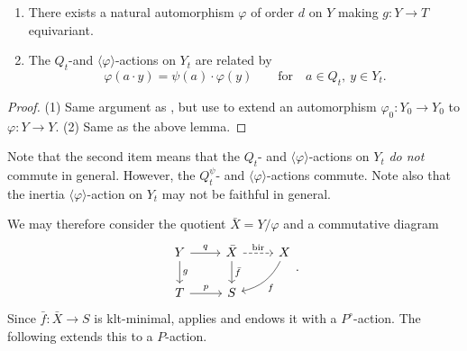 \documentclass[reqno, letterpaper]{amsart}
\numberwithin{equation}{subsection}
\let\to\longrightarrow
\begin{document}
			\begin{proposition} \label{prop:varphi-action}
				\begin{enumerate}
					\item There exists a natural automorphism $\varphi$ of order $d$ on $Y$ making $g : Y \to T$ equivariant.
					\item The $Q_t$-and $\langle \varphi \rangle$-actions on $Y_t$ are related by
					\[ \varphi(a \cdot y) = \psi(a) \cdot \varphi(y) \qquad\mbox{for}\quad a \in Q_t , \ y \in Y_t .\]
				\end{enumerate}
			\end{proposition}
			\begin{proof}
				(1) Same argument as , but use  to extend an automorphism $\varphi_0 : Y_0 \to Y_0$ to $\varphi : Y \to Y$. (2) Same as the above lemma.
			\end{proof}
			
			\begin{remark}
				Note that the second item means that the $Q_t$- and $\langle \varphi \rangle$-actions on $Y_t$ \emph{do not} commute in general. However, the $Q_t^\psi$- and $\langle \varphi \rangle$-actions commute. Note also that the inertia $\langle \varphi \rangle$-action on $Y_t$ may not be faithful in general.
			\end{remark}
			
			We may therefore consider the quotient $\bar X = Y / \varphi$ and a commutative diagram
			\begin{equation} \label{diag:base change}
			\begin{tikzcd}
				Y \arrow[r, "q"] \arrow[d, "g"] & \bar X \arrow[r, dashed, "\mathrm{bir}"] \arrow[d, "\bar f"] & X \arrow[ld, bend left=25, "f"] \\
				T \arrow[r, "p"] & S
			\end{tikzcd}.
			\end{equation}
			Since $\bar f : \bar X \to S$ is klt-minimal,  applies and endows it with a $P^\circ$-action. The following extends this to a $P$-action.
			
\end{document}
